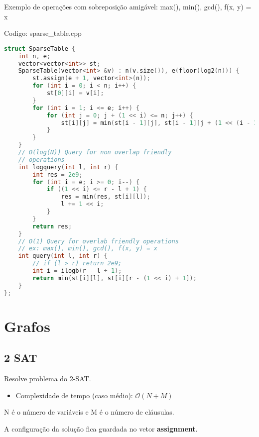 \documentclass[10pt, a4paper, oneside]{book}
\begin{document}
Exemplo de operações com sobreposição amigável: max(), min(), gcd(), f(x, y) = x

\hfill

Codigo: sparse\_table.cpp

\begin{lstlisting}[language=C++]
struct SparseTable {
    int n, e;
    vector<vector<int>> st;
    SparseTable(vector<int> &v) : n(v.size()), e(floor(log2(n))) {
        st.assign(e + 1, vector<int>(n));
        for (int i = 0; i < n; i++) {
            st[0][i] = v[i];
        }
        for (int i = 1; i <= e; i++) {
            for (int j = 0; j + (1 << i) <= n; j++) {
                st[i][j] = min(st[i - 1][j], st[i - 1][j + (1 << (i - 1))]);
            }
        }
    }
    // O(log(N)) Query for non overlap friendly
    // operations
    int logquery(int l, int r) {
        int res = 2e9;
        for (int i = e; i >= 0; i--) {
            if ((1 << i) <= r - l + 1) {
                res = min(res, st[i][l]);
                l += 1 << i;
            }
        }
        return res;
    }
    // O(1) Query for overlab friendly operations
    // ex: max(), min(), gcd(), f(x, y) = x
    int query(int l, int r) {
        // if (l > r) return 2e9;
        int i = ilogb(r - l + 1);
        return min(st[i][l], st[i][r - (1 << i) + 1]);
    }
};
\end{lstlisting}
\hfill

\newpage

%
%
%
%

\chapter{Grafos}

\section{2 SAT}


Resolve problema do 2-SAT.



\begin{itemize}
\item Complexidade de tempo (caso médio): $\mathcal{O}(N + M)$
\end{itemize}



N é o número de variáveis e M é o número de cláusulas.  

A configuração da solução fica guardada no vetor \textbf{assignment}. 
\end{document}
